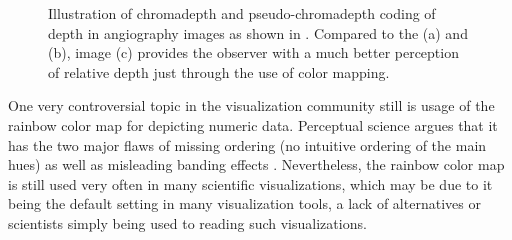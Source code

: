 \begin{figure}[ht]
	\centering
	\caption{
		Illustration of chromadepth and pseudo-chromadepth coding of depth in angiography images as shown in \cite{Ropinski:2006:Chromadepth}.
		Compared to the (a) and (b), image (c) provides the observer with a much better perception of relative depth just through the use of color mapping. 
	}
	\label{fig:background:ropinski-angio-depth}
\end{figure}

One very controversial topic in the visualization community still is usage of the rainbow color map for depicting numeric data.
Perceptual science argues that it has the two major flaws of missing ordering (no intuitive ordering of the main hues) as well as misleading banding effects \cite{Borland:2007:RainbowColormap}.
Nevertheless, the rainbow color map is still used very often in many scientific visualizations, which may be due to it being the default setting in many visualization tools, a lack of alternatives or scientists simply being used to reading such visualizations.

